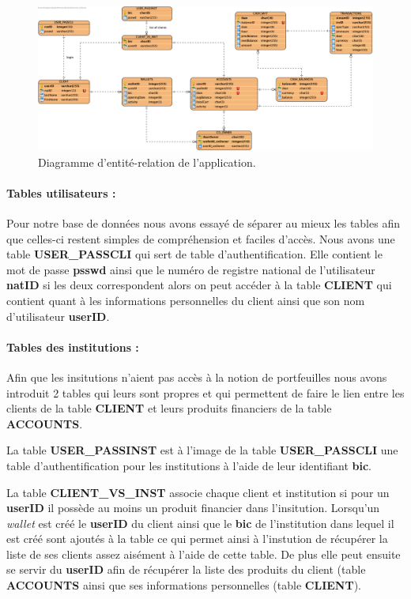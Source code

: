 \documentclass[../rapport.tex]{subfiles}
\begin{document}
	
	\begin{figure}[h]
		\centering \includegraphics[scale=0.4]{ressources/photos_diagrammes/erd.png}
		\caption{Diagramme d'entité-relation de l'application.}
	\end{figure}
	
	\paragraph{Tables utilisateurs :}
	Pour notre base de données nous avons essayé de séparer au mieux les tables afin que celles-ci restent simples de compréhension et faciles d'accès. Nous avons une table \textbf{USER\_PASSCLI} qui sert de table d'authentification. Elle contient le mot de passe \textbf{psswd} ainsi que le numéro de registre national de l'utilisateur \textbf{natID} si les deux correspondent alors on peut accéder à la table \textbf{CLIENT} qui contient quant à les informations personnelles du client ainsi que son nom d'utilisateur \textbf{userID}.
	
	\paragraph{Tables des institutions :} Afin que les insitutions n'aient pas accès à la notion de portfeuilles nous avons introduit 2 tables qui leurs sont propres et qui permettent de faire le lien entre les clients de la table \textbf{CLIENT} et leurs produits financiers de la table \textbf{ACCOUNTS}.
	
	\medskip
	
	La table \textbf{USER\_PASSINST} est à l'image de la table \textbf{USER\_PASSCLI} une table d'authentification pour les institutions à l'aide de leur identifiant \textbf{bic}. 
	
	\medskip
	
	La table \textbf{CLIENT\_VS\_INST} associe chaque client et institution si pour un \textbf{userID} il possède au moins un produit financier dans l'insitution. Lorsqu'un \textit{wallet} est créé le \textbf{userID} du client ainsi que le \textbf{bic} de l'institution dans lequel il est créé sont ajoutés à la table ce qui permet ainsi à l'instution de récupérer la liste de ses clients assez aisément à l'aide de cette table. De plus elle peut ensuite se servir du \textbf{userID} afin de récupérer la liste des produits du client (table \textbf{ACCOUNTS} ainsi que ses informations personnelles (table \textbf{CLIENT}).
	
\end{document}
